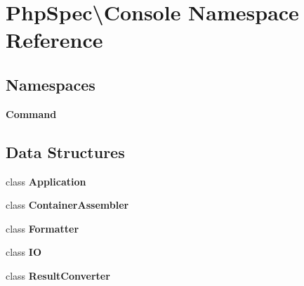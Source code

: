 \section{Php\+Spec\textbackslash{}Console Namespace Reference}
\label{namespace_php_spec_1_1_console}
\subsection*{Namespaces}
\begin{DoxyCompactItemize}
\item 
 {\bf Command}
\end{DoxyCompactItemize}
\subsection*{Data Structures}
\begin{DoxyCompactItemize}
\item 
class {\bf Application}
\item 
class {\bf Container\+Assembler}
\item 
class {\bf Formatter}
\item 
class {\bf I\+O}
\item 
class {\bf Result\+Converter}
\end{DoxyCompactItemize}
